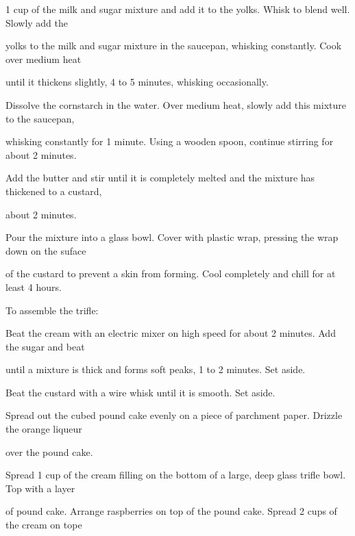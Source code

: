 \documentclass[a4paper,portrait,12pt]{book}
\begin{document}
1 cup of the milk and sugar mixture and add it to the yolks. Whisk to blend well. Slowly add the




yolks to the milk and sugar mixture in the saucepan, whisking constantly. Cook over medium heat




until it thickens slightly, 4 to 5 minutes, whisking occasionally.




Dissolve the cornstarch in the water. Over medium heat, slowly add this mixture to the saucepan,




whisking constantly for 1 minute. Using a wooden spoon, continue stirring for about 2 minutes.




Add the butter and stir until it is completely melted and the mixture has thickened to a custard,




about 2 minutes.




Pour the mixture into a glass bowl. Cover with plastic wrap, pressing the wrap down on the suface




of the custard to prevent a skin from forming. Cool completely and chill for at least 4 hours.




To assemble the trifle:




Beat the cream with an electric mixer on high speed for about 2 minutes. Add the sugar and beat




until a mixture is thick and forms soft peaks, 1 to 2 minutes. Set aside.




Beat the custard with a wire whisk until it is smooth. Set aside.




Spread out the cubed pound cake evenly on a piece of parchment paper. Drizzle the orange liqueur




over the pound cake.




Spread 1 cup of the cream filling on the bottom of a large, deep glass trifle bowl. Top with a layer




of pound cake. Arrange raspberries on top of the pound cake. Spread 2 cups of the cream on tope
\end{document}
